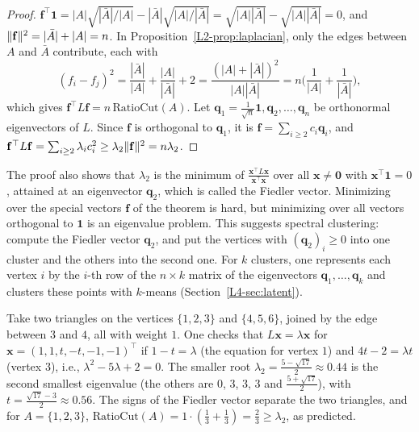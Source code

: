 \begin{proof}
    $\mathbf{f}^\top\mathbf{1} = |A|\sqrt{|\bar{A}|/|A|} - |\bar{A}|\sqrt{|A|/|\bar{A}|} = \sqrt{|A||\bar{A}|} - \sqrt{|A||\bar{A}|} = 0$, and $\lVert \mathbf{f} \rVert^2 = |\bar{A}| + |A| = n$. In Proposition~\ref{L2-prop:laplacian}, only the edges between $A$ and $\bar{A}$ contribute, each with
    \[(f_i - f_j)^2 = \frac{|\bar{A}|}{|A|} + \frac{|A|}{|\bar{A}|} + 2 = \frac{(|A| + |\bar{A}|)^2}{|A||\bar{A}|} = n\Big(\frac{1}{|A|} + \frac{1}{|\bar{A}|}\Big),\]
    which gives $\mathbf{f}^\top L\mathbf{f} = n\,\mathrm{RatioCut}(A)$. Let $\mathbf{q}_1 = \frac{1}{\sqrt{n}}\mathbf{1}, \mathbf{q}_2, \ldots, \mathbf{q}_n$ be orthonormal eigenvectors of $L$. Since $\mathbf{f}$ is orthogonal to $\mathbf{q}_1$, it is $\mathbf{f} = \sum_{i \geq 2} c_i\mathbf{q}_i$, and $\mathbf{f}^\top L\mathbf{f} = \sum_{i \geq 2} \lambda_ic_i^2 \geq \lambda_2\lVert \mathbf{f} \rVert^2 = n\lambda_2$.
\end{proof}

The proof also shows that $\lambda_2$ is the minimum of $\frac{\mathbf{x}^\top L\mathbf{x}}{\mathbf{x}^\top \mathbf{x}}$ over all $\mathbf{x} \neq \mathbf{0}$ with $\mathbf{x}^\top\mathbf{1} = 0$, attained at an eigenvector $\mathbf{q}_2$, which is called the Fiedler vector. Minimizing over the special vectors $\mathbf{f}$ of the theorem is hard, but minimizing over all vectors orthogonal to $\mathbf{1}$ is an eigenvalue problem. This suggests spectral clustering: compute the Fiedler vector $\mathbf{q}_2$, and put the vertices with $(\mathbf{q}_2)_i \geq 0$ into one cluster and the others into the second one. For $k$ clusters, one represents each vertex $i$ by the $i$-th row of the $n \times k$ matrix of the eigenvectors $\mathbf{q}_1, \ldots, \mathbf{q}_k$ and clusters these points with $k$-means (Section~\ref{L4-sec:latent}).

\begin{example}\label{L2-ex:two-triangles}
    Take two triangles on the vertices $\{1, 2, 3\}$ and $\{4, 5, 6\}$, joined by the edge between $3$ and $4$, all with weight $1$. One checks that $L\mathbf{x} = \lambda \mathbf{x}$ for $\mathbf{x} = (1, 1, t, -t, -1, -1)^\top$ if $1 - t = \lambda$ (the equation for vertex $1$) and $4t - 2 = \lambda t$ (vertex $3$), i.e., $\lambda^2 - 5\lambda + 2 = 0$. The smaller root $\lambda_2 = \frac{5 - \sqrt{17}}{2} \approx 0.44$ is the second smallest eigenvalue (the others are $0$, $3$, $3$, $3$ and $\frac{5 + \sqrt{17}}{2}$), with $t = \frac{\sqrt{17} - 3}{2} \approx 0.56$. The signs of the Fiedler vector separate the two triangles, and for $A = \{1, 2, 3\}$, $\mathrm{RatioCut}(A) = 1 \cdot (\frac{1}{3} + \frac{1}{3}) = \frac{2}{3} \geq \lambda_2$, as predicted.
\end{example}

